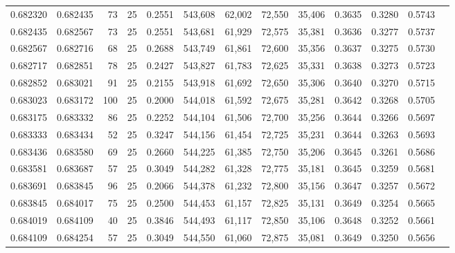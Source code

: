 \begin{tabular}{rrrrrrrrrrrrr}
0.682320 & 0.682435 &    73 &  25 &                                     0.2551 & 543,608 &  62,002 &  72,550 &  35,406 & 0.3635 & 0.3280 & 0.5743 \\
0.682435 & 0.682567 &    73 &  25 &                                     0.2551 & 543,681 &  61,929 &  72,575 &  35,381 & 0.3636 & 0.3277 & 0.5737 \\
0.682567 & 0.682716 &    68 &  25 &                                     0.2688 & 543,749 &  61,861 &  72,600 &  35,356 & 0.3637 & 0.3275 & 0.5730 \\
0.682717 & 0.682851 &    78 &  25 &                                     0.2427 & 543,827 &  61,783 &  72,625 &  35,331 & 0.3638 & 0.3273 & 0.5723 \\
0.682852 & 0.683021 &    91 &  25 &                                     0.2155 & 543,918 &  61,692 &  72,650 &  35,306 & 0.3640 & 0.3270 & 0.5715 \\
0.683023 & 0.683172 &   100 &  25 &                                     0.2000 & 544,018 &  61,592 &  72,675 &  35,281 & 0.3642 & 0.3268 & 0.5705 \\
0.683175 & 0.683332 &    86 &  25 &                                     0.2252 & 544,104 &  61,506 &  72,700 &  35,256 & 0.3644 & 0.3266 & 0.5697 \\
0.683333 & 0.683434 &    52 &  25 &                                     0.3247 & 544,156 &  61,454 &  72,725 &  35,231 & 0.3644 & 0.3263 & 0.5693 \\
0.683436 & 0.683580 &    69 &  25 &                                     0.2660 & 544,225 &  61,385 &  72,750 &  35,206 & 0.3645 & 0.3261 & 0.5686 \\
0.683581 & 0.683687 &    57 &  25 &                                     0.3049 & 544,282 &  61,328 &  72,775 &  35,181 & 0.3645 & 0.3259 & 0.5681 \\
0.683691 & 0.683845 &    96 &  25 &                                     0.2066 & 544,378 &  61,232 &  72,800 &  35,156 & 0.3647 & 0.3257 & 0.5672 \\
0.683845 & 0.684017 &    75 &  25 &                                     0.2500 & 544,453 &  61,157 &  72,825 &  35,131 & 0.3649 & 0.3254 & 0.5665 \\
0.684019 & 0.684109 &    40 &  25 &                                     0.3846 & 544,493 &  61,117 &  72,850 &  35,106 & 0.3648 & 0.3252 & 0.5661 \\
0.684109 & 0.684254 &    57 &  25 &                                     0.3049 & 544,550 &  61,060 &  72,875 &  35,081 & 0.3649 & 0.3250 & 0.5656 \\

\end{tabular}
